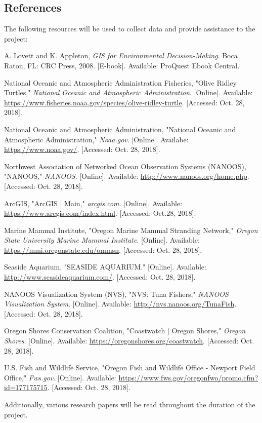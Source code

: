 \documentclass[onecolumn, draftclsnofoot,10pt, compsoc]{IEEEtran}
\begin{document}
\begin{singlespace}
\subsection{References}
The following resources will be used to collect data and provide assistance to the project:
\begin{enumerate}[label={[\arabic*]}]
    \item A. Lovett and K. Appleton, \textit{GIS for Environmental Decision-Making}. Boca Raton, FL: CRC Press, 2008. [E-book]. Available: ProQuest Ebook Central.
    \item National Oceanic and Atmospheric Administration Fisheries, "Olive Ridley Turtles," \textit{National Oceanic and Atmospheric Administration}. [Online]. Available: \url{https://www.fisheries.noaa.gov/species/olive-ridley-turtle}. [Accessed: Oct. 28, 2018].
    \item National Oceanic and Atmospheric Administration, "National Oceanic and Atmospheric Administration," \textit{Noaa.gov}. [Online]. Availabe: \url{https://www.noaa.gov/}. [Accessed: Oct. 28, 2018].
    \item Northwest Association of Networked Ocean Observation Systems (NANOOS), "NANOOS," \textit{NANOOS}. [Online]. Available: \url{http://www.nanoos.org/home.php}. [Accessed: Oct. 28, 2018].
    \item ArcGIS, "ArcGIS | Main," \textit{arcgis.com}. [Online]. Available: \url{https://www.arcgis.com/index.html}. [Accessed: Oct.28, 2018].
    \item Marine Mammal Institute, "Oregon Marine Mammal Stranding Network," \textit{Oregon State University Marine Mammal Institute}. [Online]. Available: \url{https://mmi.oregonstate.edu/ommsn}. [Accessed: Oct. 28, 2018].
    \item Seaside Aquarium, "SEASIDE AQUARIUM." [Online]. Available: \url{http://www.seasideaquarium.com/}. [Accessed: Oct. 28, 2018].
    \item NANOOS Visualization System (NVS), "NVS: Tuna Fishers," \textit{NANOOS Visualization System}. [Online]. Available: \url{http://nvs.nanoos.org/TunaFish}. [Accessed: Oct. 28, 2018].
    \item Oregon Shores Conservation Coalition, "Coastwatch | Oregon Shores," \textit{Oregon Shores}. [Online]. Available: \url{https://oregonshores.org/coastwatch}. [Accessed: Oct. 28, 2018].
    \item U.S. Fish and Wildlife Service, "Oregon Fish and Wildlife Office - Newport Field Office," \textit{Fws.gov}. [Online]. Available: \url{https://www.fws.gov/oregonfwo/promo.cfm?id=177175715}. [Accessed: Oct. 28, 2018].
\end{enumerate}
    Additionally, various research papers will be read throughout the duration of the project.

\end{singlespace}
\end{document}
